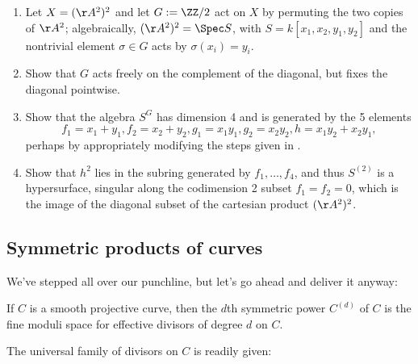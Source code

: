 \begin{exercise}
 \label{sym2A2} 
 \begin{enumerate}
 \item Let $X = (\AA^{2})^{2}$ and let $G := \ZZ/2$ act on $X$ by permuting the two copies of  $\AA^{2}$; algebraically,
$(\AA^{2})^{2} = \Spec S$, with $S = k[x_{1},x_{2}, y_{1}, y_{2}]$ and the nontrivial element $\sigma\in G$ acts by
$\sigma(x_{i}) = y_{i}$. 
\item Show that $G$ acts freely on the complement of the diagonal, but fixes the diagonal pointwise.
\item Show that the algebra $S^{G}$ has dimension 4 and is generated by the 5 elements
$$ 
f_{1} = x_{1}+y_{1}, f_{2} = x_{2}+y_{2}, g_{1} = x_{1}y_{1}, g_{2} = x_{2}y_{2}, h = x_{1}y_{2}+x_{2}y_{1},
$$
perhaps by appropriately modifying the steps given in \cite[Exercise 1.6]{Eisenbud1995}. 
\item Show that $h^2$ lies in the subring generated by $f_1,\dots, f_4$, and thus $S^{(2)}$ is a hypersurface, singular
along the  codimension 2 subset $f_{1} = f_{2} = 0$, which is the image of the diagonal subset of the 
cartesian product $(\AA^{2})^{2}$.
\end{enumerate}
\end{exercise}



\subsection{Symmetric products of curves}

We've stepped all over our punchline, but let's go ahead and deliver it anyway:
\begin{fact}
If $C$ is a smooth projective curve, then the $d$th symmetric power $C^{(d)}$ of $C$ is the fine moduli space for effective divisors of degree $d$ on $C$.
\end{fact}

The universal family of divisors on $C$ is readily given:

%
%
 
